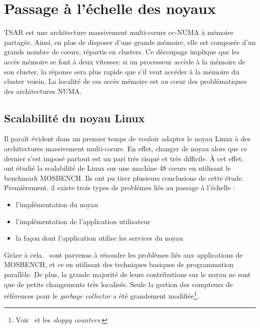   
  \section{Passage à l’échelle des noyaux}
  \label{sec:scalability}

    TSAR est une architecture massivement multi-c\oe urs
    cc-NUMA à
    mémoire partagée. Ainsi, en plus de disposer d'une grande mémoire, elle est
    composée d'un grands nombre de c\oe urs, répartis en clusters. Ce découpage
    implique que les accès mémoire se font à deux vitesses: si un processeur
    accède à la mémoire de son cluster, la réponse sera plus rapide que s'il
    veut accéder à la mémoire du cluster voisin. La localité de ces accès
    mémoire est au c\oe ur des problématiques des architectures NUMA. %


    \subsection{Scalabilité du noyau Linux}

      Il paraît évident dans un premier temps de vouloir adapter le noyau Linux
      à des architectures massivement multi-c\oe urs. En effet, changer de noyau
      alors que ce dernier s’est imposé partout est un pari très risqué et très
      difficile. À cet effet,~\citet{boyd2010analysis} ont étudié la scalabilité
      de Linux sur une machine 48 c\oe urs en utilisant le benchmark
      MOSBENCH. Ils ont pu tirer plusieurs conclusions de cette étude.
      Premièrement, il existe trois types de problèmes liés au passage à
      l’échelle :
      \begin{itemize}
        \item l’implémentation du noyau
        \item l’implémentation de l’application utilisateur
        \item la façon dont l’application utilise les services du noyau
      \end{itemize}
      Grâce à cela,~\citeauthor{boyd2010analysis} sont parvenus à résoudre les
      problèmes liés aux applications de MOSBENCH, et ce en utilisant des
      techniques basiques de programmation parallèle. De plus, la grande
      majorité de leurs contributions sur le noyau ne sont que de petits
      changements très localisés. Seule la gestion des compteurs de références
      pour le \textit{garbage collector} a été grandement
      modifiée\footnote{Voir~\citep{boyd2010analysis} et les \textit{sloppy
          counters}.}.

